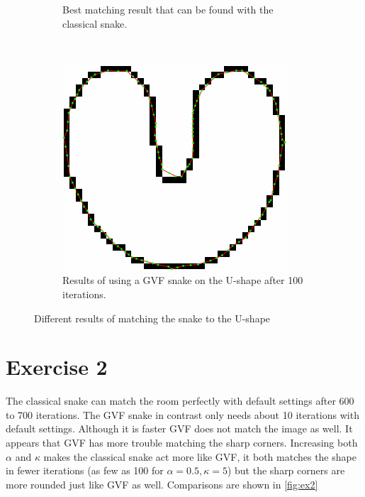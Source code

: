 \documentclass[a4paper]{article}
\begin{document}
\begin{figure}
\begin{subfigure}[t]{.3\textwidth}
		\caption{Best matching result that can be found with the classical snake.}
		\label{fig:bestu}
	\end{subfigure}~
	\begin{subfigure}[t]{.3\textwidth}
		\centering
		\includegraphics[width=\textwidth]{gvffirst}
		\caption{Results of using a GVF snake on the U-shape after 100 iterations.}
		\label{fig:firstgvf}
	\end{subfigure}
	\caption{Different results of matching the snake to the U-shape}
\end{figure}

\section*{Exercise 2}
The classical snake can match the room perfectly with default settings after 600 to 700 iterations. The GVF snake in contrast only needs about 10 iterations with default settings. Although it is faster GVF does not match the image as well. It appears that GVF has more trouble matching the sharp corners. Increasing both $\alpha$ and $\kappa$ makes the classical snake act more like GVF, it both matches the shape in fewer iterations (as few as 100 for $\alpha=0.5, \kappa=5$) but the sharp corners are more rounded just like GVF as well. Comparisons are shown in \autoref{fig:ex2}
\end{document}
